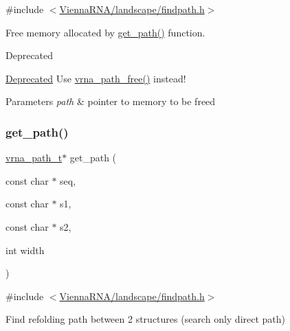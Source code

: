 {\ttfamily \#include $<$\mbox{\hyperlink{landscape_2findpath_8h}{Vienna\+R\+N\+A/landscape/findpath.\+h}}$>$}



Free memory allocated by \mbox{\hyperlink{group__paths__deprecated_gac009a44db824f90a6de5f9c28b9b3222}{get\+\_\+path()}} function. 

\begin{DoxyRefDesc}{Deprecated}
\item[\mbox{\hyperlink{deprecated__deprecated000166}{Deprecated}}]Use \mbox{\hyperlink{group__paths_ga3763dc16760d09277a1b1c3f3061d0c7}{vrna\+\_\+path\+\_\+free()}} instead!\end{DoxyRefDesc}



\begin{DoxyParams}{Parameters}
{\em path} & pointer to memory to be freed \\
\hline
\end{DoxyParams}
\mbox{\label{group__paths__deprecated_gac009a44db824f90a6de5f9c28b9b3222}} 
\subsubsection{\texorpdfstring{get\_path()}{get\_path()}}
{\footnotesize\ttfamily \mbox{\hyperlink{group__paths_ga818d4f3d1cf8723d6905990b08d909fe}{vrna\+\_\+path\+\_\+t}}$\ast$ get\+\_\+path (\begin{DoxyParamCaption}\item[{const char $\ast$}]{seq,  }\item[{const char $\ast$}]{s1,  }\item[{const char $\ast$}]{s2,  }\item[{int}]{width }\end{DoxyParamCaption})}



{\ttfamily \#include $<$\mbox{\hyperlink{landscape_2findpath_8h}{Vienna\+R\+N\+A/landscape/findpath.\+h}}$>$}



Find refolding path between 2 structures (search only direct path) 

